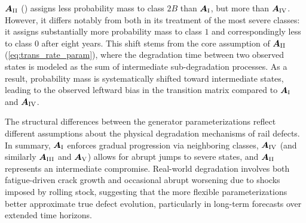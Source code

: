 $\bm{A}_{\RN{2}}$ () assigns less probability mass to class $2B$ than $\bm{A}_{\RN{1}}$, but more than $\bm{A}_{\RN{4}}$. However, it differs notably from both in its treatment of the most severe classes: it assigns substantially more probability mass to class $1$ and correspondingly less to class $0$ after eight years.
This shift stems from the core assumption of $\bm{A}_{\RN{2}}$ (\cref{eq:trans_rate_param}), where the degradation time between two observed states is modeled as the sum of intermediate sub-degradation processes.
As a result, probability mass is systematically shifted toward intermediate states, leading to the observed leftward bias in the transition matrix compared to $\bm{A}_{\RN{1}}$ and $\bm{A}_{\RN{4}}$.

The structural differences between the generator parameterizations reflect different assumptions about the physical degradation mechanisms of rail defects.
In summary, $\bm{A}_{\RN{1}}$ enforces gradual progression via neighboring classes, $\bm{A}_{\RN{4}}$ (and similarly $\bm{A}_{\RN{3}}$ and $\bm{A}_{\RN{5}}$) allows for abrupt jumps to severe states, and $\bm{A}_{\RN{2}}$ represents an intermediate compromise. Real-world degradation involves both fatigue-driven crack growth and occasional abrupt worsening due to shocks imposed by rolling stock, suggesting that the more flexible parameterizations better approximate true defect evolution, particularly in long-term forecasts over extended time horizons.


